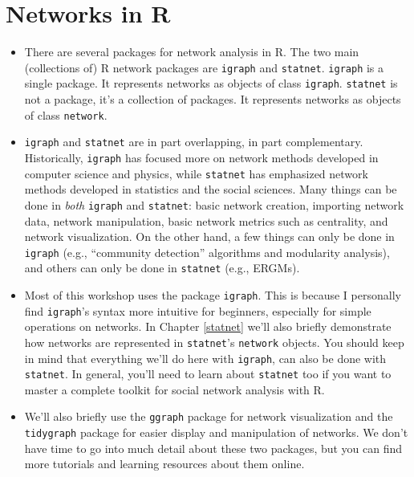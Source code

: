\documentclass[
]{book}
\providecommand{\tightlist}{%
  \setlength{\itemsep}{0pt}\setlength{\parskip}{0pt}}
\begin{document}
\hypertarget{networks-in-r}{%
\section{Networks in R}\label{networks-in-r}}

\begin{itemize}
\tightlist
\item
  There are several packages for network analysis in R. The two main (collections of) R network packages are \texttt{igraph} and \texttt{statnet}. \texttt{igraph} is a single package. It represents networks as objects of class \texttt{igraph}. \texttt{statnet} is not a package, it's a collection of packages. It represents networks as objects of class \texttt{network}.
\item
  \texttt{igraph} and \texttt{statnet} are in part overlapping, in part complementary. Historically, \texttt{igraph} has focused more on network methods developed in computer science and physics, while \texttt{statnet} has emphasized network methods developed in statistics and the social sciences. Many things can be done in \emph{both} \texttt{igraph} and \texttt{statnet}: basic network creation, importing network data, network manipulation, basic network metrics such as centrality, and network visualization. On the other hand, a few things can only be done in \texttt{igraph} (e.g., ``community detection'' algorithms and modularity analysis), and others can only be done in \texttt{statnet} (e.g., ERGMs).
\item
  Most of this workshop uses the package \texttt{igraph}. This is because I personally find \texttt{igraph}'s syntax more intuitive for beginners, especially for simple operations on networks. In Chapter \ref{statnet} we'll also briefly demonstrate how networks are represented in \texttt{statnet}'s \texttt{network} objects. You should keep in mind that everything we'll do here with \texttt{igraph}, can also be done with \texttt{statnet}. In general, you'll need to learn about \texttt{statnet} too if you want to master a complete toolkit for social network analysis with R.
\item
  We'll also briefly use the \texttt{ggraph} package for network visualization and the \texttt{tidygraph} package for easier display and manipulation of networks. We don't have time to go into much detail about these two packages, but you can find more tutorials and learning resources about them online.


\end{itemize}
\end{document}
